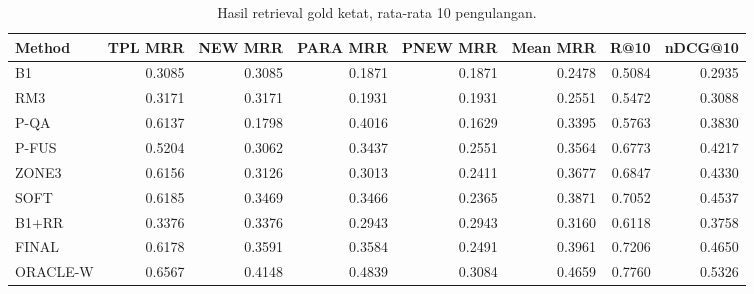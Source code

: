 \begin{table}[t]
\centering
\small
\caption{Hasil retrieval gold ketat, rata-rata 10 pengulangan.}
\label{tab:main-results}
\begin{tabular}{lrrrrrrr}
\toprule
Method & TPL MRR & NEW MRR & PARA MRR & PNEW MRR & Mean MRR & R@10 & nDCG@10 \\
\midrule
B1 & 0.3085 & 0.3085 & 0.1871 & 0.1871 & 0.2478 & 0.5084 & 0.2935 \\
RM3 & 0.3171 & 0.3171 & 0.1931 & 0.1931 & 0.2551 & 0.5472 & 0.3088 \\
P-QA & 0.6137 & 0.1798 & 0.4016 & 0.1629 & 0.3395 & 0.5763 & 0.3830 \\
P-FUS & 0.5204 & 0.3062 & 0.3437 & 0.2551 & 0.3564 & 0.6773 & 0.4217 \\
ZONE3 & 0.6156 & 0.3126 & 0.3013 & 0.2411 & 0.3677 & 0.6847 & 0.4330 \\
SOFT & 0.6185 & 0.3469 & 0.3466 & 0.2365 & 0.3871 & 0.7052 & 0.4537 \\
B1+RR & 0.3376 & 0.3376 & 0.2943 & 0.2943 & 0.3160 & 0.6118 & 0.3758 \\
FINAL & 0.6178 & 0.3591 & 0.3584 & 0.2491 & 0.3961 & 0.7206 & 0.4650 \\
ORACLE-W & 0.6567 & 0.4148 & 0.4839 & 0.3084 & 0.4659 & 0.7760 & 0.5326 \\
\bottomrule
\end{tabular}
\end{table}
